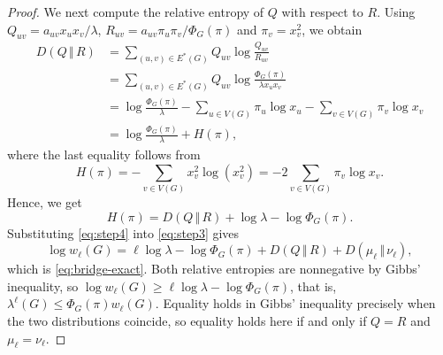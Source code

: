 \documentclass[11pt, a4paper]{article}
\theoremstyle{definition}
\theoremstyle{plain}
\renewcommand{\le}{\leqslant}
\renewcommand{\ge}{\geqslant}
\newcommand{\PhiG}{\Phi_G}
\begin{document}
\begin{proof}
\smallskip
We next compute the relative entropy of $Q$ with respect to $R$. Using $Q_{uv}=a_{uv}x_ux_v/\lambda$,
$R_{uv}=a_{uv}\pi_u\pi_v/\PhiG(\pi )$ and $\pi_v=x_v^2$,
we obtain 
\begin{align*}
  D(Q \, \Vert \, R)
  &=\sum_{(u,v)\in E^* (G)}Q_{uv}
      \log\frac{Q_{uv}}{R_{uv}}\\
  &=\sum_{(u,v)\in E^* (G)}Q_{uv}
      \log\frac{\PhiG(\pi)}{\lambda x_ux_v}\\
  &=\log\frac{\PhiG(\pi)}{\lambda}
    -\sum_{u\in V(G)}\pi_u\log x_u
    -\sum_{v\in V(G)}\pi_v\log x_v\\
  &=\log\frac{\PhiG(\pi)}{\lambda}+H(\pi),
\end{align*}
where the last equality follows from
\[
  H(\pi)=-\sum_{v\in V(G)}x_v^2\log(x_v^2)
  =-2\sum_{v\in V(G)}\pi_v\log x_v.
\]
 Hence, we get 
\begin{equation}\label{eq:step4}
  H(\pi )=D(Q \, \Vert \, R)+\log \lambda -\log \Phi_G(\pi) .
\end{equation}
Substituting \eqref{eq:step4} into \eqref{eq:step3}
gives
\[
  \log w_\ell (G)=\ell \log \lambda -\log \Phi_G(\pi)
  +D(Q\, \Vert \, R)+D(\mu_\ell \, \Vert \, \nu_\ell ),
\]
which is \eqref{eq:bridge-exact}. Both relative
entropies are nonnegative by Gibbs' inequality, so
$\log w_\ell (G)\ge \ell \log \lambda -\log \Phi_G(\pi)$,
that is, $\lambda^\ell (G)\le \Phi_G(\pi) w_\ell (G)$.
Equality holds in Gibbs' inequality precisely when the two distributions coincide, so equality holds here if
and only if $Q=R$ and $\mu_\ell =\nu_\ell$.
\end{proof}
\end{document}
